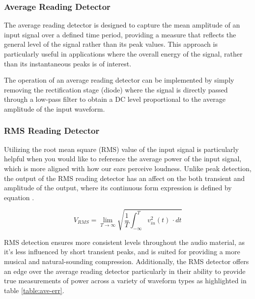 \documentclass[10pt]{article}
\begin{document}
\begin{multicols*}{2}
                \subsubsection{Average Reading Detector}
                    The average reading detector is designed to capture the mean amplitude of an input signal over a defined time period, providing a measure that reflects the general level of the signal rather than its peak values. This approach is particularly useful in applications where the overall energy of the signal, rather than its instantaneous peaks is of interest.\par
                    The operation of an average reading detector can be implemented by simply removing the rectification stage (diode) where the signal is directly passed through a low-pass filter to obtain a DC level proportional to the average amplitude of the input waveform. 
                
                \subsubsection{RMS Reading Detector}
                    Utilizing the root mean square (RMS) value of the input signal is particularly helpful when you would like to reference the average power of the input signal, which is more aligned with how our ears perceive loudness. Unlike peak detection, the output of the RMS reading detector has an affect on the both transient and amplitude of the output, where its continuous form expression is defined by equation \cite{aes-that-rms}.
                    
                        \begin{equation}
                            V_{RMS} = \lim_{T \to \infty}\sqrt{\frac{1}{T}\int_{-\infty}^{T} v_{in}^2(t) \,\cdot dt}
                        \end{equation}
                    
                    \noindent RMS detection ensures more consistent levels throughout the audio material, as it's less influenced by short transient peaks, and is suited for providing a more musical and natural-sounding compression. Additionally, the RMS detector offers an edge over the average reading detector particularly in their ability to provide true measurements of power across a variety of waveform types as highlighted in table \ref{table:ave-err}.


\end{multicols*}
\end{document}
